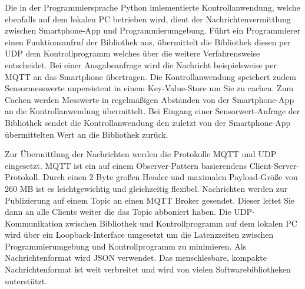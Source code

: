 \documentclass[11pt,a4paper]{report}
\begin{document}
Die in der Programmiersprache Python imlementierte Kontrollanwendung, welche ebenfalls auf dem lokalen PC betrieben wird, dient der Nachrichtenvermittlung zwischen Smartphone-App und Programmierumgebung.
Führt ein Programmierer einen Funktionsaufruf der Bibliothek aus, übermittelt die Bibliothek diesen per UDP dem Kontrollprogramm welches über die weitere Verfahrensweise entscheidet.
Bei einer Ausgabeanfrage wird die Nachricht beispielsweise per MQTT an das Smartphone übertragen.
Die Kontrollanwendung speichert zudem Sensormesswerte unpersistent in einem Key-Value-Store um Sie zu cachen.
Zum Cachen werden Messwerte in regelmäßigen Abständen von der Smartphone-App an die Kontrollanwendung übermittelt.
Bei Eingang einer Sensorwert-Anfrage der Bibliothek sendet die Kontrollanwendung den zuletzt von der Smartphone-App übermittelten Wert an die Bibliothek zurück.

Zur Übermittlung der Nachrichten werden die Protokolle MQTT und UDP eingesetzt.
MQTT ist ein auf einem Observer-Pattern basierendens Client-Server-Protokoll.
Durch einen 2 Byte großen Header und maximalen Payload-Größe von 260 MB ist es leichtgewichtig und gleichzeitig flexibel.
Nachrichten werden zur Publizierung auf einem Topic an einen MQTT Broker gesendet.
Dieser leitet Sie dann an alle Clients weiter die das Topic abboniert haben.
Die UDP-Kommunikation zwischen Bibliothek und Kontrollprogramm auf dem lokalen PC wird über ein Loopback-Interface umgesetzt um die Latenzzeiten zwischen Programmierumgebung und Kontrollprogramm zu minimieren.
Als Nachrichtenformat wird JSON verwendet.
Das menschlesbare, kompakte Nachrichtenformat ist weit verbreitet und wird von vielen Softwarebibliotheken unterstützt.
\end{document}

